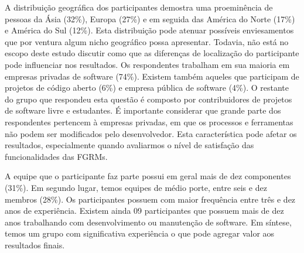 A distribuição geográfica dos participantes demostra uma proeminência de pessoas
da Ásia (32\%), Europa (27\%) e em seguida das América do Norte (17\%) e América
do Sul (12\%). Esta distribuição pode atenuar possíveis enviesamentos que por
ventura algum nicho geográfico possa apresentar. Todavia, não está no escopo
deste estudo discutir como que as diferenças de localização do participante pode
influenciar nos resultados. Os respondentes trabalham em sua maioria em empresas
privadas de software (74\%). Existem também aqueles que participam de projetos
de código aberto (6\%) e empresa pública de software (4\%). O restante do grupo
que respondeu esta questão é composto por contribuidores de projetos de software
livre e estudantes. É importante considerar que grande parte dos respondentes
pertencem à empresas privadas, em que os processos e ferramentas não podem ser
modificados pelo desenvolvedor. Esta característica pode afetar os resultados,
especialmente quando avaliarmos o nível de satisfação das funcionalidades das
FGRMs.




A equipe que o participante faz parte possui em geral mais de dez componentes
(31\%). Em segundo lugar, temos equipes de médio porte, entre seis e dez membros
(28\%). Os participantes possuem com maior frequência entre três e dez anos de
experiência. Existem ainda 09 participantes que possuem mais de dez anos
trabalhando com desenvolvimento ou manutenção de software. Em síntese, temos um
grupo com significativa experiência o que pode agregar valor aos resultados
finais.


